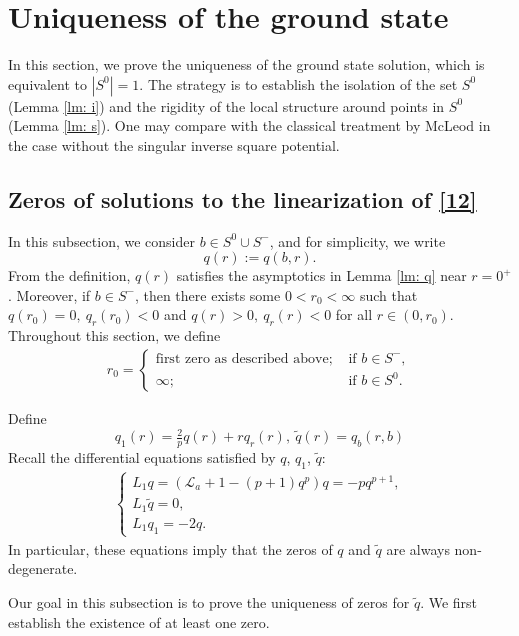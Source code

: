 \documentclass[12pt]{amsart}
\newcommand{\la}{\mathcal L_a}
\begin{document}
 \section{Uniqueness of the ground state \label{S:uniqueness}}

In this section, we prove the uniqueness of the ground state solution, which is equivalent to $|S^0|=1$. The strategy is to establish the isolation of the set $S^0$ (Lemma \ref{lm: i}) and the rigidity of the local structure around points in $S^0$ (Lemma \ref{lm: s}). One may compare with the classical treatment by McLeod \cite{McLeod} in the case without the singular inverse square potential. 


\subsection{Zeros of solutions to the linearization of \eqref{12}}  

In this  subsection, we consider $b\in S^0\cup S^-$, and for simplicity, we write 
   \[
   q(r):=q(b,r).
   \]
  From the definition, $q(r)$ satisfies the asymptotics in Lemma \ref{lm: q} near $r=0^+$. Moreover, if $b \in S^-$, 
then there exists some $0<r_0<\infty$ such that $q(r_0)=0, \ q_r(r_0)<0$ and $q(r)>0,\  q_r(r)<0$ for all $r\in (0,r_0)$. Throughout this section, we define
   \begin{align*}
   r_0=\begin{cases} \mbox{first zero as described above}; & \mbox{ if } b\in S^-,\\
   \infty;&\mbox{ if } b\in S^0. 
   \end{cases}
   \end{align*}
   

Define    
    \[
    q_1(r)=\tfrac 2p q(r)+rq_r(r), \ \tilde q(r)=q_b(r,b)
    \]
  Recall the differential equations satisfied by $q$, $q_1$, $\tilde q$: 
    \begin{align*}
    \begin{cases}
    L_1 q=(\la+1-(p+1)q^p) q=-pq^{p+1},\\
    L_1 \tilde q
    =0,\\
    L_1 q_1=-2q.
    \end{cases}
    \end{align*}
 In particular, these equations imply that the zeros of $q$ and $\tilde q$ are always non-degenerate.   
    
    Our goal in this subsection is to prove the uniqueness of zeros for $\tilde q$. We first establish the existence of at least one zero. 
    
\end{document}
